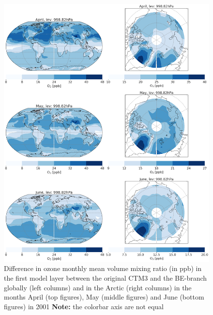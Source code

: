 \begin{figure}[h]
    \centering
    \includegraphics[width = \linewidth]{Chapter6_Results/images/BE_origPD_vmr_AprJun.png}
    \caption{Difference in ozone monthly mean volume mixing ratio (in ppb) in the first model layer between the original CTM3 and the BE-branch globally (left columns) and in the Arctic (right columns) in the months April (top figures), May (middle figures) and June (bottom figures) in 2001 \textbf{Note:} the colorbar axis are not equal}
    \label{fig:BE_origPD_vmr_AprJun}
\end{figure}